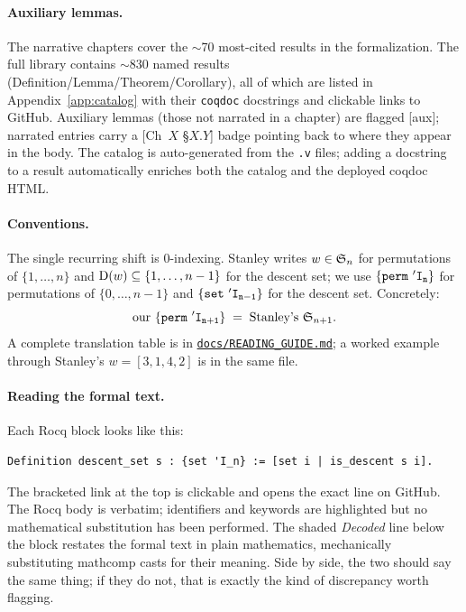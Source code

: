 \paragraph{Auxiliary lemmas.} The narrative chapters cover the
$\sim$70 most-cited results in the formalization. The full library
contains $\sim$830 named results
(Definition/Lemma/Theorem/Corollary), all of which are listed in
Appendix~\ref{app:catalog} with their \texttt{coqdoc} docstrings
and clickable links to GitHub. Auxiliary lemmas (those not
narrated in a chapter) are flagged \textsf{[aux]}; narrated entries
carry a \textsf{[Ch~$X$ §$X.Y$]} badge pointing back to where they
appear in the body. The catalog is auto-generated from the
\texttt{.v} files; adding a docstring to a result automatically
enriches both the catalog and the deployed coqdoc HTML.

\paragraph{Conventions.} The single recurring shift is 0-indexing.
Stanley writes $w \in \mathfrak{S}_{n}$ for permutations of $\{1, \dots, n\}$
and $\mathrm{D}(w) \subseteq \{1, \dots, n-1\}$ for the descent set;
we use $\mathtt{\{perm\ \mathtt{'I_{n}}\}}$ for permutations of
$\{0, \dots, n-1\}$ and $\mathtt{\{set\ \mathtt{'I_{n-1}}\}}$ for the descent set.
Concretely:
\[
  \text{our } \mathtt{\{perm\ \mathtt{'I_{n+1}}\}} \;=\; \text{Stanley's } \mathfrak{S}_{n+1}.
\]
A complete translation table is in
\href{https://github.com/LLM4Rocq/mathcomp-eulerian/blob/main/docs/READING_GUIDE.md}{\texttt{docs/READING\_GUIDE.md}};
a worked example through Stanley's $w = [3,1,4,2]$ is in the same file.

\paragraph{Reading the formal text.} Each Rocq block looks like
this:

\begin{lstlisting}[language=Rocq]
Definition descent_set s : {set 'I_n} := [set i | is_descent s i].
\end{lstlisting}

\noindent The bracketed link at the top is clickable and opens the
exact line on GitHub. The Rocq body is verbatim; identifiers and
keywords are highlighted but no mathematical substitution has been
performed. The shaded \emph{Decoded} line below the block restates
the formal text in plain mathematics, mechanically substituting
mathcomp casts for their meaning. Side by side, the two should say
the same thing; if they do not, that is exactly the kind of
discrepancy worth flagging.

